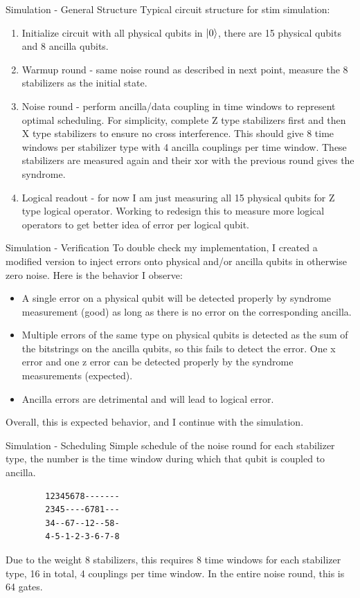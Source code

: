 \documentclass{beamer}
\begin{document}
\begin{frame}{Simulation - General Structure}
    Typical circuit structure for stim simulation:
    \begin{enumerate}
        \item Initialize circuit with all physical qubits in $\ket{0}$, there are 15 physical qubits and 8 ancilla qubits.
        \item Warmup round - same noise round as described in next point, measure the 8 stabilizers as the initial state. 
        \item Noise round - perform ancilla/data coupling in time windows to represent optimal scheduling. For simplicity, complete Z type stabilizers first and then X type stabilizers to ensure no cross interference. This should give 8 time windows per stabilizer type with 4 ancilla couplings per time window. These stabilizers are measured again and their xor with the previous round gives the syndrome.
        \item Logical readout - for now I am just measuring all 15 physical qubits for Z type logical operator. Working to redesign this to measure more logical operators to get better idea of error per logical qubit.
    \end{enumerate}
\end{frame}

\begin{frame}{Simulation - Verification}
    To double check my implementation, I created a modified version to inject errors onto physical and/or ancilla qubits in otherwise zero noise. Here is the behavior I observe:
    \begin{itemize}
        \item A single error on a physical qubit will be detected properly by syndrome measurement (good) as long as there is no error on the corresponding ancilla.
        \item Multiple errors of the same type on physical qubits is detected as the sum of the bitstrings on the ancilla qubits, so this fails to detect the error. One x error and one z error can be detected properly by the syndrome measurements (expected).
        \item Ancilla errors are detrimental and will lead to logical error.
    \end{itemize}
    Overall, this is expected behavior, and I continue with the simulation.
\end{frame}

\begin{frame}[fragile]{Simulation - Scheduling}
    Simple schedule of the noise round for each stabilizer type, the number is the time window during which that qubit is coupled to ancilla. 
    \begin{verbatim}
        12345678-------
        2345----6781---
        34--67--12--58-
        4-5-1-2-3-6-7-8
    \end{verbatim}
    Due to the weight 8 stabilizers, this requires 8 time windows for each stabilizer type, 16 in total, 4 couplings per time window. In the entire noise round, this is 64 gates.
\end{frame}
\end{document}
